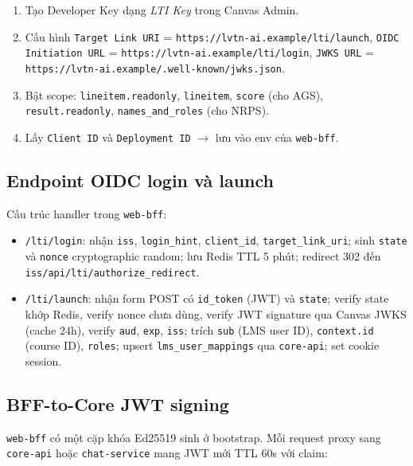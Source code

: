 \begin{enumerate}
    \item Tạo Developer Key dạng \textit{LTI Key} trong Canvas Admin.
    \item Cấu hình \texttt{Target Link URI} =
          \texttt{https://lvtn-ai.example/lti/launch},
          \texttt{OIDC Initiation URL} =
          \texttt{https://lvtn-ai.example/lti/login},
          \texttt{JWKS URL} = \texttt{https://lvtn-ai.example/.well-known/jwks.json}.
    \item Bật scope: \texttt{lineitem.readonly}, \texttt{lineitem},
          \texttt{score} (cho AGS), \texttt{result.readonly},
          \texttt{names\_and\_roles} (cho NRPS).
    \item Lấy \texttt{Client ID} và \texttt{Deployment ID} $\to$ lưu vào
          env của \texttt{web-bff}.
\end{enumerate}

\subsection{Endpoint OIDC login và launch}

Cấu trúc handler trong \texttt{web-bff}:

\begin{itemize}
    \item \texttt{/lti/login}: nhận \texttt{iss}, \texttt{login\_hint},
          \texttt{client\_id}, \texttt{target\_link\_uri}; sinh
          \texttt{state} và \texttt{nonce} cryptographic random; lưu
          Redis TTL 5 phút; redirect 302 đến
          \texttt{{iss}/api/lti/authorize\_redirect}.
    \item \texttt{/lti/launch}: nhận form POST có
          \texttt{id\_token} (JWT) và \texttt{state}; verify state
          khớp Redis, verify nonce chưa dùng, verify JWT signature qua
          Canvas JWKS (cache 24h), verify \texttt{aud}, \texttt{exp},
          \texttt{iss}; trích \texttt{sub} (LMS user ID),
          \texttt{context.id} (course ID), \texttt{roles}; upsert
          \texttt{lms\_user\_mappings} qua \texttt{core-api}; set
          cookie session.
\end{itemize}

\subsection{BFF-to-Core JWT signing}

\texttt{web-bff} có một cặp khóa Ed25519 sinh ở bootstrap. Mỗi request
proxy sang \texttt{core-api} hoặc \texttt{chat-service} mang JWT mới
TTL 60s với claim:

